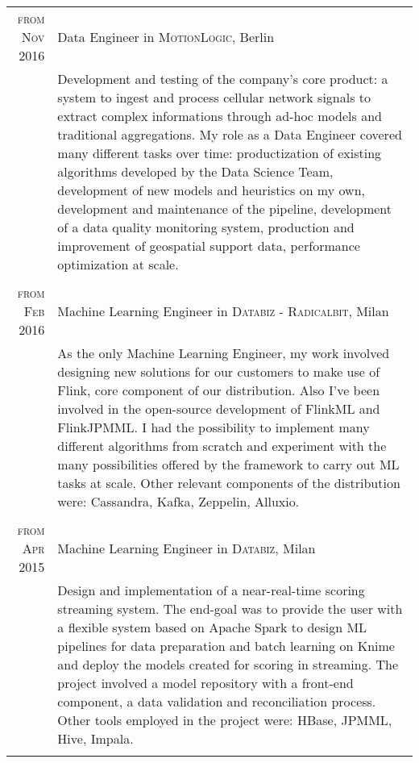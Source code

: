 \documentclass[a4paper,10pt]{article} %
\begin{document}
\begin{tabular}{r|p{11cm}}
\textsc{from Nov 2016} & Data Engineer in \textsc{MotionLogic}, Berlin \emph{}\\
& \footnotesize{Development and testing of the company's core product: a system to ingest and process cellular network signals to extract complex informations through ad-hoc models and traditional aggregations. My role as a Data Engineer covered many different tasks over time: productization of existing algorithms developed by the Data Science Team, development of new models and heuristics on my own, development and maintenance of the pipeline, development of a data quality monitoring system, production and improvement of geospatial support data, performance optimization at scale.}\\
\multicolumn{1}{c}{} \\
	
\textsc{from Feb 2016} & Machine Learning Engineer in \textsc{Databiz - Radicalbit}, Milan \emph{}\\
& \footnotesize{As the only Machine Learning Engineer, my work involved designing new solutions for our customers to make use of Flink, core component of our distribution. Also I've been involved in the open-source development of FlinkML and FlinkJPMML. I had the possibility to implement many different algorithms from scratch and experiment with the many possibilities offered by the framework to carry out ML tasks at scale. Other relevant components of the distribution were: Cassandra, Kafka, Zeppelin, Alluxio.}\\
\multicolumn{2}{c}{} \\

\textsc{from Apr 2015} & Machine Learning Engineer in \textsc{Databiz}, Milan \emph{}\\
& \footnotesize{Design and implementation of a near-real-time scoring streaming system. The end-goal was to provide the user with a flexible system based on Apache Spark to design ML pipelines for data preparation and batch learning on Knime and deploy the models created for scoring in streaming. The project involved a model repository with a front-end component, a data validation and reconciliation process. Other tools employed in the project were: HBase, JPMML, Hive, Impala.}\\
\multicolumn{2}{c}{} \\

\end{tabular}

\end{document}
